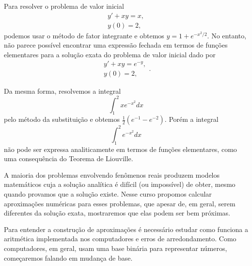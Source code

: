 Para resolver o problema de valor inicial 
$$
\begin{array}{l}
y'+xy=x,\\
y(0)=2,
\end{array}
$$
podemos usar o método de fator integrante e obtemos $y=1+e^{-x^2/2}$. No entanto, não parece possível  encontrar uma expressão fechada em termos de funções elementares para a solução exata do problema de valor inicial dado por 
$$
\begin{array}{l}
y'+xy=e^{-y},\\
y(0)=2,
\end{array}.
$$


Da mesma forma, resolvemos a integral
$$
\int_1^2xe^{-x^2}dx
$$
pelo método da substituição e obtemos $\frac{1}{2}(e^{-1}-e^{-2})$. Porém a integral
$$
\int_1^2 e^{-x^2} dx
$$
não pode ser expressa analiticamente em termos de funções elementares, como uma consequência do Teorema de Liouville.

A maioria dos problemas envolvendo fenômenos reais produzem modelos matemáticos cuja a solução analítica é difícil (ou impossível) de obter, mesmo quando provamos que a solução existe. Nesse curso propomos calcular aproximações numéricas para esses problemas, que apesar de, em geral, serem diferentes da solução exata, mostraremos que elas podem ser bem próximas.

Para entender a construção de aproximações é necessário estudar como funciona a aritmética implementada nos computadores e erros de arredondamento. Como computadores, em geral, usam uma base binária para representar números, começaremos falando em mudança de base.


%
